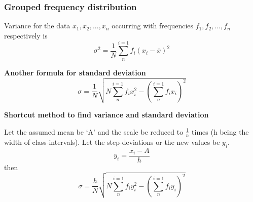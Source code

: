 \documentclass[12pt]{article}
\newcommand{\summation}[2]{\sum\limits^{#1}_{#2}}
\begin{document}
\begin{multicols}{2}
\begin{itemize}
    \subsubsection*{Grouped  frequency distribution } Variance for the data    $x_1, x_2, ..., x_n$ occurring with frequencies $f_1, f_2 , ..., f_n$ respectively is 
    $$\sigma^2=\frac{1}{N} \summation{i=1}{n}f_i(x_i-\bar{x})^2$$

    \textbf{Another formula for standard deviation}
    $$\sigma = \frac{1}{N} \sqrt{N \summation{i=1}{n}f_i x_i^2 -(\summation{i=1}{n}f_i x_i)^2}$$

    \textbf{Shortcut method to find variance and standard deviation}

    Let the assumed mean be ‘A’ and the scale be reduced to $\frac{1}{h}$ times (h being the
width of class-intervals). Let the step-deviations or the new values be $y_i$.
$$y_i =\frac{x_i- A}{h}$$
then $$\sigma =\frac{h}{N} \sqrt{N \summation{i=1}{n}f_i y_i^2-(\summation{i=1}{n}f_i y_i)^2}$$
\end{itemize}










\end{multicols}
\end{document}
